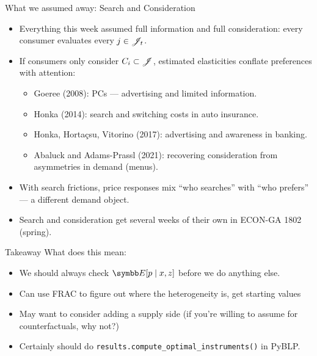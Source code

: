 \documentclass[aspectratio=169,10pt]{beamer}
\begin{document}
\begin{frame}{What we assumed away: Search and Consideration}
\begin{itemize}
\item Everything this week assumed \alert{full information} and \alert{full consideration}: every consumer evaluates every $j \in \mathscr{J}_t$.
\item If consumers only consider $C_i \subset \mathscr{J}$, estimated elasticities conflate \alert{preferences} with \alert{attention}:
\begin{itemize}
\item Goeree (2008): PCs --- advertising and limited information.
\item Honka (2014): search and switching costs in auto insurance.
\item Honka, Horta\c{c}su, Vitorino (2017): advertising and awareness in banking.
\item Abaluck and Adams-Prassl (2021): recovering consideration from asymmetries in demand (menus).
\end{itemize}
\item With search frictions, price responses mix ``who searches'' with ``who prefers'' --- a different demand object.
\item Search and consideration get several weeks of their own in ECON-GA 1802 (spring).
\end{itemize}
\end{frame}


\begin{frame}{Takeaway}
What does this mean:
\begin{itemize}
    \item We should always check $\E[p \mid x, z]$ before we do anything else.
    \item Can use FRAC to figure out where the heterogeneity is, get starting values
    \item May want to consider adding a supply side (if you're willing to assume for counterfactuals, why not?)
    \item Certainly should do \texttt{results.compute\_optimal\_instruments()} in PyBLP.
\end{itemize}
\end{frame}
\end{document}
